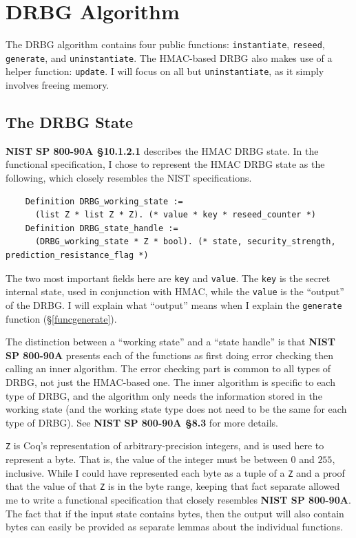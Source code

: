 \documentclass[pageno]{jpaper}
\newcommand{\stdtitle}[1]{\textbf{#1}}
\begin{document}
\section{DRBG Algorithm}
The DRBG algorithm contains four public functions: \lstinline{instantiate}, \lstinline{reseed}, \lstinline{generate}, and \lstinline{uninstantiate}. The HMAC-based DRBG also makes use of a helper function: \lstinline{update}. I will focus on all but \lstinline{uninstantiate}, as it simply involves freeing memory.

\subsection{The DRBG State} \label{funcstate}

\stdtitle{NIST SP 800-90A \S 10.1.2.1} describes the HMAC DRBG state. In the functional specification, I chose to represent the HMAC DRBG state as the following, which closely resembles the NIST specifications.

\begin{lstlisting}
    Definition DRBG_working_state :=
      (list Z * list Z * Z). (* value * key * reseed_counter *)
    Definition DRBG_state_handle :=
      (DRBG_working_state * Z * bool). (* state, security_strength, prediction_resistance_flag *)
\end{lstlisting}

The two most important fields here are \lstinline{key} and \lstinline{value}. The \lstinline{key} is the secret internal state, used in conjunction with HMAC, while the \lstinline{value} is the “output” of the DRBG. I will explain what “output” means when I explain the \lstinline{generate} function (\S \ref{funcgenerate}).

The distinction between a “working state” and a “state handle” is that \stdtitle{NIST SP 800-90A} presents each of the functions as first doing error checking then calling an inner algorithm. The error checking part is common to all types of DRBG, not just the HMAC-based one. The inner algorithm is specific to each type of DRBG, and the algorithm only needs the information stored in the working state (and the working state type does not need to be the same for each type of DRBG). See \stdtitle{NIST SP 800-90A \S 8.3} for more details.

\lstinline{Z} is Coq’s representation of arbitrary-precision integers, and is used here to represent a byte. That is, the value of the integer must be between $0$ and $255$, inclusive. While I could have represented each byte as a tuple of a \lstinline{Z} and a proof that the value of that \lstinline{Z} is in the byte range, keeping that fact separate allowed me to write a functional specification that closely resembles \stdtitle{NIST SP 800-90A}. The fact that if the input state contains bytes, then the output will also contain bytes can easily be provided as separate lemmas about the individual functions.
\end{document}
